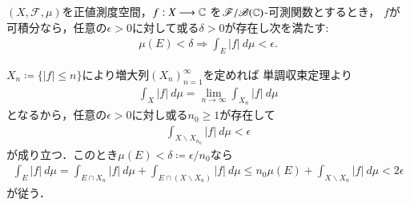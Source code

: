 	\begin{screen}
		\begin{thm}[可積分なら積分値を一様に小さくできる]\label{thm:integrable_intvalue_uniformly_shrinking}
			$(X,\mathscr{F},\mu)$を正値測度空間，$f:X \longrightarrow \mathbb{C}$
			を$\mathscr{F}/\mathscr{B}(\mathbb{C})$-可測関数とするとき，
			$f$が可積分なら，任意の$\epsilon > 0$に対して或る$\delta > 0$が存在し次を満たす:
			\begin{align}
				\mu(E) < \delta \Longrightarrow \int_E |f|\ d\mu < \epsilon.
			\end{align}
		\end{thm}
	\end{screen}
	
	\begin{prf}
		$X_n \coloneqq \{|f| \leq n\}$により増大列$(X_n)_{n=1}^\infty$を定めれば
		単調収束定理より
		\begin{align}
			\int_X |f|\ d\mu = \lim_{n \to \infty} \int_{X_n} |f|\ d\mu
		\end{align}
		となるから，任意の$\epsilon > 0$に対し或る$n_0 \geq 1$が存在して
		\begin{align}
			\int_{X \backslash X_{n_0}} |f|\ d\mu < \epsilon
		\end{align}
		が成り立つ．このとき$\mu(E) < \delta \coloneqq \epsilon/n_0$なら
		\begin{align}
			\int_E |f|\ d\mu
			= \int_{E \cap X_n} |f|\ d\mu + \int_{E \cap (X \backslash X_n)} |f|\ d\mu
			\leq n_0 \mu(E) + \int_{X \backslash X_n} |f|\ d\mu
			< 2\epsilon
		\end{align}
		が従う．
		\QED
	\end{prf}